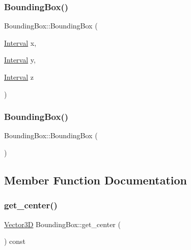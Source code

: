 \subsubsection{\texorpdfstring{BoundingBox()}{BoundingBox()}\hspace{0.1cm}{\footnotesize\ttfamily [1/2]}}
{\footnotesize\ttfamily Bounding\+Box\+::\+Bounding\+Box (\begin{DoxyParamCaption}\item[{\mbox{\hyperlink{classInterval}{Interval}}}]{x,  }\item[{\mbox{\hyperlink{classInterval}{Interval}}}]{y,  }\item[{\mbox{\hyperlink{classInterval}{Interval}}}]{z }\end{DoxyParamCaption})}

\mbox{\label{classBoundingBox_a6e401c4da5839950f1f30c8b8c4d1208}} 
\subsubsection{\texorpdfstring{BoundingBox()}{BoundingBox()}\hspace{0.1cm}{\footnotesize\ttfamily [2/2]}}
{\footnotesize\ttfamily Bounding\+Box\+::\+Bounding\+Box (\begin{DoxyParamCaption}{ }\end{DoxyParamCaption})}



\subsection{Member Function Documentation}
\mbox{\label{classBoundingBox_afc3618e024bd7c1e822ddee127c0eabd}} 
\subsubsection{\texorpdfstring{get\_center()}{get\_center()}}
{\footnotesize\ttfamily \mbox{\hyperlink{classVector3D}{Vector3D}} Bounding\+Box\+::get\+\_\+center (\begin{DoxyParamCaption}{ }\end{DoxyParamCaption}) const}

